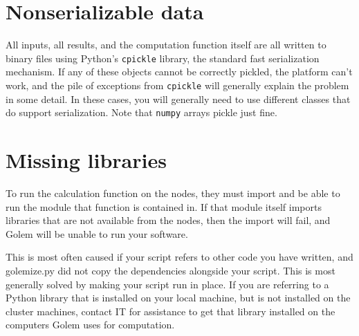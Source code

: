 \documentclass[11pt,ebook,oneside,final]{memoir} %
\begin{document}
\section{Nonserializable data}
All inputs, all results, and the computation function itself are all written to binary files using Python's \texttt{cpickle} library, the standard fast serialization mechanism. If any of these objects cannot be correctly pickled, the platform can't work, and the pile of exceptions from \texttt{cpickle} will generally explain the problem in some detail. In these cases, you will generally need to use different classes that do support serialization. Note that \texttt{numpy} arrays pickle just fine.
\section{Missing libraries}
To run the calculation function on the nodes, they must import and be able to run the module that function is contained in.  If that module itself imports libraries that are not available from the nodes, then the import will fail, and Golem will be unable to run your software.

This is most often caused if your script refers to other code you have written, and golemize.py did not copy the dependencies alongside your script. This is most generally solved by making your script run in place. If you are referring to a Python library that is installed on your local machine, but is not installed on the cluster machines, contact IT for assistance to get that library installed on the computers Golem uses for computation.
\end{document}
